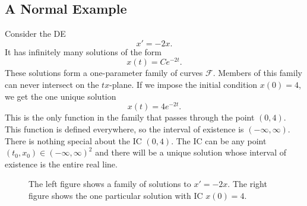 \documentclass[11pt,letterpaper]{article}
\begin{document}
\subsection{A Normal Example}
Consider the DE
\[
x'=-2x.
\]
It has infinitely many solutions of the form
\[
x(t)=Ce^{-2t}.
\]
These solutions form a one-parameter family of curves $\mathcal{F}$. Members of this family can never intersect on the $tx$-plane. If we impose the
initial condition $x(0)=4$, we get the one unique solution
\[
x(t)=4e^{-2t}.
\]
This is the only function in the family that passes through the point $(0,4)$. This function is defined everywhere, so the interval of existence is $(-\infty,\infty)$. There is nothing special about the IC $(0,4)$. The IC can be any point $(t_0,x_0)\in(-\infty,\infty)^2$ and there will be a unique solution whose interval of existence is the entire real line.

\begin{figure}[H]
    \centering
{}\caption{The left figure shows a family of solutions to $x'=-2x$. The right figure shows the one particular solution with IC $x(0)=4$.}
\end{figure}

\end{document}

